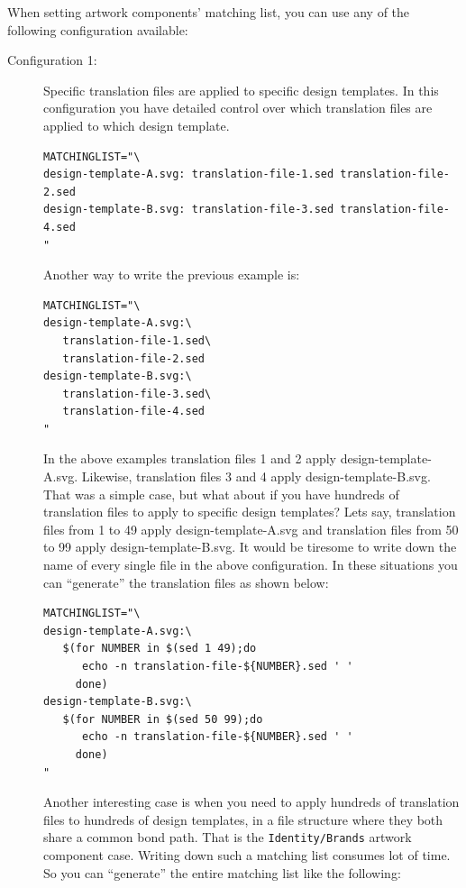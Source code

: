 When setting artwork components' matching list, you can use any of the
following configuration available:

\begin{description}

\item[Configuration 1:] Specific translation files are applied to
specific design templates. In this configuration you have detailed
control over which translation files are applied to which design
template.

\begin{verbatim}
MATCHINGLIST="\
design-template-A.svg: translation-file-1.sed translation-file-2.sed
design-template-B.svg: translation-file-3.sed translation-file-4.sed
"
\end{verbatim}

Another way to write the previous example is: 

\begin{verbatim}
MATCHINGLIST="\
design-template-A.svg:\
   translation-file-1.sed\
   translation-file-2.sed
design-template-B.svg:\
   translation-file-3.sed\
   translation-file-4.sed
"
\end{verbatim}

In the above examples translation files 1 and 2 apply
design-template-A.svg. Likewise, translation files 3 and 4 apply
design-template-B.svg. That was a simple case, but what about if you
have hundreds of translation files to apply to specific design
templates? Lets say, translation files from 1 to 49 apply
design-template-A.svg and translation files from 50 to 99 apply
design-template-B.svg.  It would be tiresome to write down the name of
every single file in the above configuration. In these situations you
can ``generate'' the translation files as shown below: 

\begin{verbatim}
MATCHINGLIST="\
design-template-A.svg:\
   $(for NUMBER in $(sed 1 49);do
      echo -n translation-file-${NUMBER}.sed ' '
     done)
design-template-B.svg:\
   $(for NUMBER in $(sed 50 99);do
      echo -n translation-file-${NUMBER}.sed ' '
     done)
"
\end{verbatim}

Another interesting case is when you need to apply hundreds of
translation files to hundreds of design templates, in a file structure
where they both share a common bond path.  That is the
\texttt{Identity/Brands} artwork component case.  Writing down such a
matching list consumes lot of time.  So you can ``generate'' the
entire matching list like the following:


\end{description}
